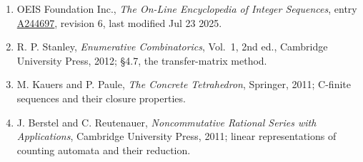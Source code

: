 \documentclass[11pt]{article}
\theoremstyle{definition}
\begin{document}
\begin{enumerate}

\item OEIS Foundation Inc., \emph{The On-Line Encyclopedia of Integer Sequences}, entry \href{https://oeis.org/A244697}{A244697}, revision 6, last modified Jul 23 2025.

\item R. P. Stanley, \emph{Enumerative Combinatorics}, Vol.~1, 2nd ed., Cambridge University Press, 2012; \S4.7, the transfer-matrix method.

\item M. Kauers and P. Paule, \emph{The Concrete Tetrahedron}, Springer, 2011; C-finite sequences and their closure properties.

\item J. Berstel and C. Reutenauer, \emph{Noncommutative Rational Series with Applications}, Cambridge University Press, 2011; linear representations of counting automata and their reduction.

\end{enumerate}
\end{document}

